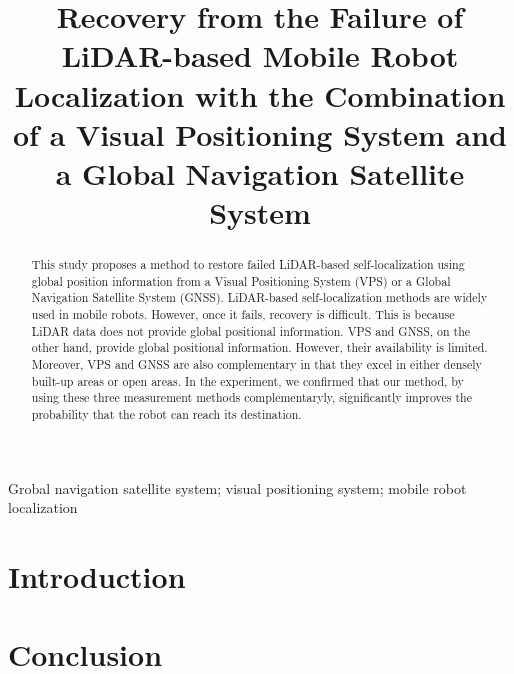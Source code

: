 \documentclass[]{interact}
\theoremstyle{plain}%
\theoremstyle{definition}
\theoremstyle{remark}
\begin{document}

\title{Recovery from the Failure of LiDAR-based Mobile Robot Localization with the Combination of a Visual Positioning System and a Global Navigation Satellite System}

\author{
}

\maketitle

\begin{abstract}
	This study proposes a method to restore failed LiDAR-based self-localization using global position information from a Visual Positioning System (VPS) or a Global Navigation Satellite System (GNSS). LiDAR-based self-localization methods are widely used in mobile robots. However, once it fails, recovery is difficult. This is because LiDAR data does not provide global positional information. VPS and GNSS, on the other hand, provide global positional information. However, their availability is limited. Moreover, VPS and GNSS are also complementary in that they excel in either densely built-up areas or open areas. In the experiment, we confirmed that our method, by using these three measurement methods complementaryly, significantly improves the probability that the robot can reach its destination.
\end{abstract}

\begin{keywords}
	Grobal navigation satellite system; visual positioning system;  mobile robot localization
\end{keywords}


\section{Introduction}

\section{Conclusion}
\end{document}
